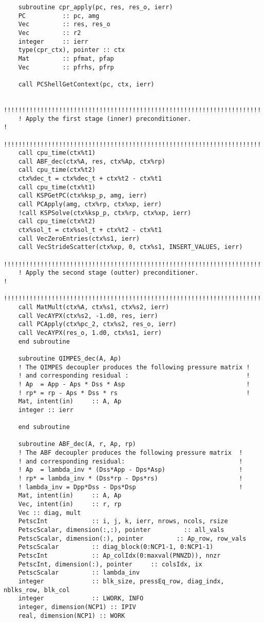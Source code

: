 \begin{lstlisting}
    subroutine cpr_apply(pc, res, res_o, ierr)
    PC          :: pc, amg
    Vec         :: res, res_o
    Vec         :: r2
    integer     :: ierr 
    type(cpr_ctx), pointer :: ctx
    Mat         :: pfmat, pfap
    Vec         :: pfrhs, pfrp

    call PCShellGetContext(pc, ctx, ierr)

    !!!!!!!!!!!!!!!!!!!!!!!!!!!!!!!!!!!!!!!!!!!!!!!!!!!!!!!!!!!!!!!!!!!!!!!
    ! Apply the first stage (inner) preconditioner.                       !
    !!!!!!!!!!!!!!!!!!!!!!!!!!!!!!!!!!!!!!!!!!!!!!!!!!!!!!!!!!!!!!!!!!!!!!!
    call cpu_time(ctx%t1)
    call ABF_dec(ctx%A, res, ctx%Ap, ctx%rp)
    call cpu_time(ctx%t2)
    ctx%dec_t = ctx%dec_t + ctx%t2 - ctx%t1
    call cpu_time(ctx%t1)
    call KSPGetPC(ctx%ksp_p, amg, ierr)
    call PCApply(amg, ctx%rp, ctx%xp, ierr)
    !call KSPSolve(ctx%ksp_p, ctx%rp, ctx%xp, ierr)
    call cpu_time(ctx%t2)
    ctx%sol_t = ctx%sol_t + ctx%t2 - ctx%t1
    call VecZeroEntries(ctx%s1, ierr)
    call VecStrideScatter(ctx%xp, 0, ctx%s1, INSERT_VALUES, ierr)
    !!!!!!!!!!!!!!!!!!!!!!!!!!!!!!!!!!!!!!!!!!!!!!!!!!!!!!!!!!!!!!!!!!!!!!!
    ! Apply the second stage (outter) preconditioner.                     !
    !!!!!!!!!!!!!!!!!!!!!!!!!!!!!!!!!!!!!!!!!!!!!!!!!!!!!!!!!!!!!!!!!!!!!!!
    call MatMult(ctx%A, ctx%s1, ctx%s2, ierr)
    call VecAYPX(ctx%s2, -1.d0, res, ierr)
    call PCApply(ctx%pc_2, ctx%s2, res_o, ierr)
    call VecAYPX(res_o, 1.d0, ctx%s1, ierr)
    end subroutine

    subroutine QIMPES_dec(A, Ap)
    ! The QIMPES decoupler produces the following pressure matrix !
    ! and corresponding residual :                                !
    ! Ap  = App - Aps * Dss * Asp                                 !
    ! rp* = rp - Aps * Dss * rs                                   !
    Mat, intent(in)     :: A, Ap
    integer :: ierr

    end subroutine

    subroutine ABF_dec(A, r, Ap, rp)
    ! The ABF decoupler produces the following pressure matrix  !
    ! and corresponding residual:                               !
    ! Ap  = lambda_inv * (Dss*App - Dps*Asp)                    !
    ! rp* = lambda_inv * (Dss*rp - Dps*rs)                      !
    ! lambda_inv = Dpp*Dss - Dps*Dsp                            !
    Mat, intent(in)     :: A, Ap
    Vec, intent(in)     :: r, rp
    Vec :: diag, mult
    PetscInt            :: i, j, k, ierr, nrows, ncols, rsize
    PetscScalar, dimension(:,:), pointer         :: all_vals 
    PetscScalar, dimension(:), pointer         :: Ap_row, row_vals
    PetscScalar         :: diag_block(0:NCP1-1, 0:NCP1-1)
    PetscInt            :: Ap_colIdx(0:maxval(PNNZD)), nnzr
    PetscInt, dimension(:), pointer     :: colsIdx, ix
    PetscScalar         :: lambda_inv
    integer             :: blk_size, pressEq_row, diag_indx, nblks_row, blk_col 
    integer             :: LWORK, INFO
    integer, dimension(NCP1) :: IPIV
    real, dimension(NCP1) :: WORK


\end{lstlisting}
